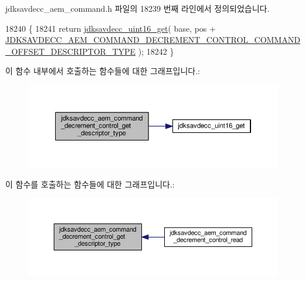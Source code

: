 jdksavdecc\+\_\+aem\+\_\+command.\+h 파일의 18239 번째 라인에서 정의되었습니다.


\begin{DoxyCode}
18240 \{
18241     \textcolor{keywordflow}{return} \hyperlink{group__endian_ga3fbbbc20be954aa61e039872965b0dc9}{jdksavdecc\_uint16\_get}( base, pos + 
      \hyperlink{group__command__decrement__control_ga2be571e0600567e6ba031bde28b57835}{JDKSAVDECC\_AEM\_COMMAND\_DECREMENT\_CONTROL\_COMMAND\_OFFSET\_DESCRIPTOR\_TYPE}
       );
18242 \}
\end{DoxyCode}


이 함수 내부에서 호출하는 함수들에 대한 그래프입니다.\+:
\nopagebreak
\begin{figure}[H]
\begin{center}
\leavevmode
\includegraphics[width=350pt]{group__command__decrement__control_gae4b568d85c7721e6508c43314ec5e321_cgraph}
\end{center}
\end{figure}




이 함수를 호출하는 함수들에 대한 그래프입니다.\+:
\nopagebreak
\begin{figure}[H]
\begin{center}
\leavevmode
\includegraphics[width=350pt]{group__command__decrement__control_gae4b568d85c7721e6508c43314ec5e321_icgraph}
\end{center}
\end{figure}



